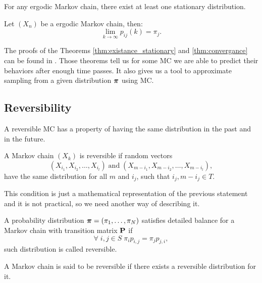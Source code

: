 	\begin{theorem} \label{thm:existance_stationary}
		For any ergodic Markov chain, there exist at least one stationary distribution.
	\end{theorem}
	
	
	\begin{theorem} \label{thm:convergance}
		Let $(X_n)$ be a ergodic Markov chain, then:
		\begin{equation*}
			\lim_{k \rightarrow \infty} p_{ij}(k) = \pi_j.
		\end{equation*}
	\end{theorem}
	The proofs of the Theorems \ref{thm:existance_stationary} and \ref{thm:convergance} can be found in \cite{haggstrom2002finite}. Those theorems tell us for some MC we are able to predict their behaviors after enough time passes. It also gives us a tool to approximate sampling from a given distribution $\boldsymbol{\pi}$ using MC.
	
\subsection{Reversibility}
	A reversible MC has a property of having the same distribution in the past and in the future.
	\begin{definition}[Reversibility]
		A Markov chain $(X_k)$ is reversible if random vectors
		\begin{equation*}
			(X_{i_1}, X_{i_2}, \ldots, X_{i_l}) \; \mathrm{and} \; (X_{m-i_1}, X_{m-i_2}, \ldots, X_{m-i_l}),
		\end{equation*}
		have the same distribution for all $m$ and $i_j$, such that $i_j, m-i_j \in T$.
	\end{definition}
	
	This condition is just a mathematical representation of the previous statement and it is not practical, so we need another way of describing it.
	\begin{definition}
		A probability distribution $\boldsymbol{\pi} = (\pi_1, \ldots, \pi_N)$ satisfies detailed balance for a Markov chain with transition matrix $\mathbf{P}$ if
		\begin{equation*}
			\forall \; i,j \in S \; \pi_i p_{i,j} = \pi_j p_{j,i},
		\end{equation*}
		such distribution is called reversible.
	\end{definition}
	
	\begin{definition}
		A Markov chain is said to be reversible if there exists a reversible distribution for it.
	\end{definition}

